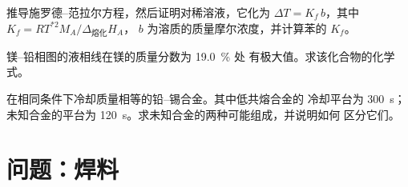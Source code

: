 \begin{exercise}[$\star\star\star$]\label{exo:b2:solid-liquid-diagrams:10}
推导施罗德–范拉尔方程，然后证明对稀溶液，它化为
$\Delta T = K_f\,b$，其中 $K_f = RT^{*2}M_A/\Delta_{\text{熔化}}H_A$，
$b$ 为溶质的质量摩尔浓度，并计算苯的 $K_f$。
\end{exercise}

\begin{exercise}[$\star\star\star$]\label{exo:b2:solid-liquid-diagrams:11}
镁–铅相图的液相线在镁的质量分数为 19.0~\% 处
有极大值。求该化合物的化学式。
\end{exercise}

\begin{exercise}[$\star\star\star$]\label{exo:b2:solid-liquid-diagrams:12}
在相同条件下冷却质量相等的铅–锡合金。其中低共熔合金的
冷却平台为 \qty{300}{s}；未知合金的平台为
\qty{120}{s}。求未知合金的两种可能组成，并说明如何
区分它们。
\end{exercise}

\section{问题：焊料}

